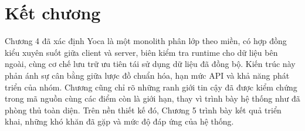 \section{Kết chương}

Chương 4 đã xác định Yoca là một monolith phân lớp theo miền, có hợp đồng kiểu xuyên suốt giữa client và server, biên kiểm tra runtime cho dữ liệu bên ngoài, cùng cơ chế lưu trữ ưu tiên tái sử dụng dữ liệu đã đồng bộ. Kiến trúc này phản ánh sự cân bằng giữa lược đồ chuẩn hóa, hạn mức API và khả năng phát triển của nhóm. Chương cũng chỉ rõ những ranh giới tin cậy đã được kiểm chứng trong mã nguồn cùng các điểm còn là giới hạn, thay vì trình bày hệ thống như đã phòng thủ toàn diện. Trên nền thiết kế đó, Chương 5 trình bày kết quả triển khai, những khó khăn đã gặp và mức độ đáp ứng của hệ thống.
